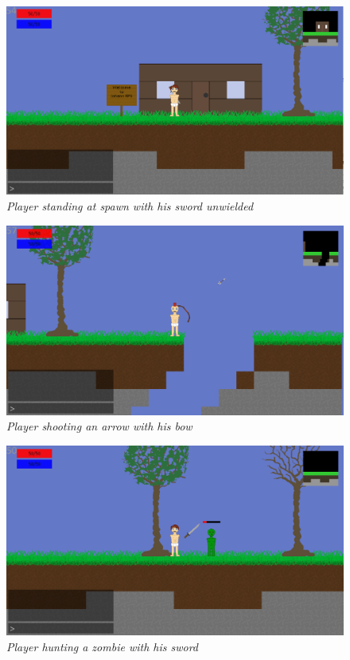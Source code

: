 \documentclass[a4paper,12pt]{article}
\begin{document}
\begin{figure}[H]
\includegraphics[width=\textwidth]{img/screenshot1.eps}\\
\emph{%
    Player standing at spawn with his sword unwielded
}
\end{figure}

\noindent
\vspace{10pt}
\begin{figure}[H]
\includegraphics[width=\textwidth]{img/screenshot2.eps}\\
\emph{%
    Player shooting an arrow with his bow
}
\end{figure}

\vspace{10pt}
\noindent
\begin{figure}[H]
\includegraphics[width=\textwidth]{img/screenshot3.eps}\\
\emph{%
    Player hunting a zombie with his sword
}
\end{figure}
\end{document}
